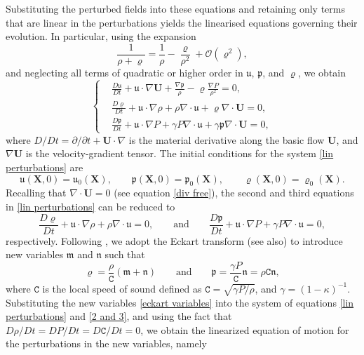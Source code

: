 \documentclass[reqno]{amsart}
\newcommand{\uu}{\boldsymbol{\mathfrak{u}}}             %
\newcommand{\m}{\mathfrak{m}}
\newcommand{\nn}{\mathfrak{n}}
\newcommand{\cs}{\texttt{C}}
\newcommand{\x}{\mathbf{X}}              %
\newcommand{\bu}{\mathbf{U}}             %
\begin{document}
Substituting the perturbed fields into these equations and retaining only
terms that are linear in the perturbations yields the linearised equations
governing their evolution. In particular, using the expansion
\[
\frac{1}{\rho+\varrho}
=
\frac{1}{\rho}
-\frac{\varrho}{\rho^2}
+\mathcal{O}(\varrho^2),
\]
and neglecting all terms of quadratic or higher order in
$\boldsymbol{\mathfrak{u}}$, $\mathfrak{p}$, and $\varrho$, we obtain 
\begin{equation}\label{lin perturbations}
    \left\{\begin{aligned}
   & \frac{ D\uu}{Dt}+\uu\cdot\nabla \bu +\frac{\nabla \mathfrak{p}}{\rho}-\varrho\frac{\nabla P}{\rho^2}=0,\\
   & \frac{D\varrho}{Dt}+\boldsymbol{\mathfrak{u}} \cdot\nabla\rho+\rho \nabla\cdot\boldsymbol{\mathfrak{u}}+\varrho\nabla\cdot\bu=0,\\
    &\frac{D\mathfrak{p}}{Dt}+\boldsymbol{\mathfrak{u}} \cdot\nabla P+\gamma P \nabla\cdot\boldsymbol{\mathfrak{u}}+\gamma\mathfrak{p}\nabla\cdot\bu=0,
\end{aligned}\right.
\end{equation}
where ${D}/{Dt}={\partial}/{\partial t} + \bu\cdot\nabla$ is the material derivative along the basic flow $\bu$, and $\nabla\bu$ is the velocity-gradient tensor. The initial conditions for the system \eqref{lin perturbations} are
\begin{equation}
    \uu(\x,0)=\uu_0(\x),\qquad  \mathfrak{p}(\x,0)=\mathfrak{p}_0(\x),\qquad  \varrho(\x,0)=\varrho_0(\x).
\end{equation}
Recalling that $\nabla\cdot\bu=0$ (see equation \eqref{div free}), the second and third equations in \eqref{lin perturbations} can be reduced to 
\begin{equation}\label{2 and 3}\frac{D\varrho}{Dt}+\boldsymbol{\mathfrak{u}} \cdot\nabla\rho+\rho \nabla\cdot\boldsymbol{\mathfrak{u}}=0,\qquad \text{and} \qquad
    \frac{D\mathfrak{p}}{Dt}+\boldsymbol{\mathfrak{u}} \cdot\nabla P+\gamma P \nabla\cdot\boldsymbol{\mathfrak{u}}=0,
\end{equation}
respectively. Following  \cite{LH, LebovitzL}, we adopt the Eckart transform (see also\cite{eckart}) to introduce new variables $\m$ and $\nn$ such that
\begin{equation}\label{eckart variables}
    \varrho=\frac{\rho}{\cs}(\m+\nn) \qquad\text{and}\qquad \mathfrak{p}=\frac{\gamma P}{\cs}\nn=\rho\cs\nn,
\end{equation}
where $\cs$ is the local speed of sound defined as $\cs=\sqrt{\gamma {P}/{\rho}}$, and $\gamma=({1-\kappa})^{-1}$. Substituting the new variables \eqref{eckart variables} into the system of equations \eqref{lin perturbations} and \eqref{2 and 3}, and using the fact that ${D\rho}/{Dt}={DP}/{Dt}={D\cs}/{Dt}=0$, we obtain the linearized equation of motion for the perturbations in the new variables, namely
\end{document}
